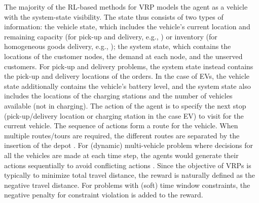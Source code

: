 \documentclass{article}
\begin{document}
The majority of the RL-based methods for VRP models the agent as a vehicle with the system-state visibility.  The state thus consists of two types of information: the vehicle state, which includes the vehicle's current location and remaining capacity (for pick-up and delivery, e.g., \citep{ulmer2020modeling,james2019online,joe2020deep}) or inventory (for homogeneous goods delivery, e.g., \citep{nazari2018reinforcement,kool2018attention,delarue2020reinforcement}); the system state, which contains the locations of the customer nodes, the demand at each node, and the unserved customers. For pick-up and delivery problems, the system state instead contains the pick-up and delivery locations of the orders. In the case of EVs, the vehicle state additionally contains the vehicle's battery level, and the system state also includes the locations of the charging stations and the number of vehicles available (not in charging). The action of the agent is to specify the next stop (pick-up/delivery location or charging station in the case EV) to visit for the current vehicle. The sequence of actions form a route for the vehicle. When multiple routes/tours are required, the different routes are separated by the insertion of the depot \citep{nazari2018reinforcement,duan2020efficiently,kool2018attention,lin2021deep}. For (dynamic) multi-vehicle problem where decisions for all the vehicles are made at each time step, the agents would generate their actions sequentially to avoid conflicting actions \citep{james2019online,zhang2020multi}.
Since the objective of VRPs is typically to minimize total travel distance, the reward is naturally defined as the negative travel distance. For problems with (soft) time window constraints, the negative penalty for constraint violation is added to the reward.
\end{document}
